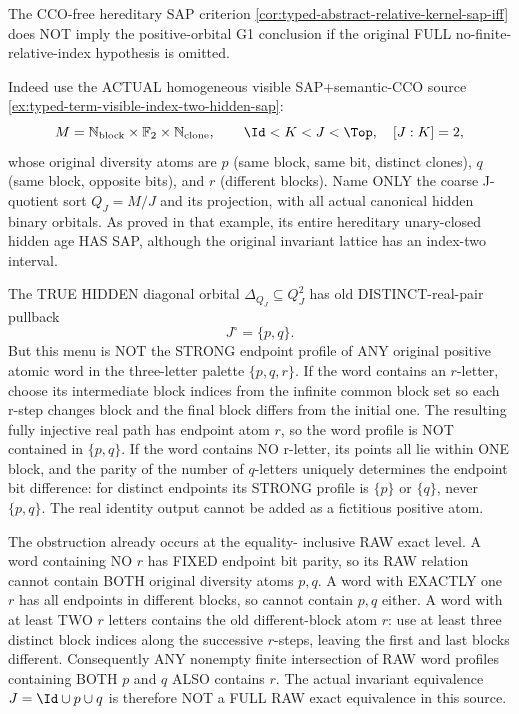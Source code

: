 \begin{remark}
\label{rem:typed-hidden-sap-not-G1-positivity}
The CCO-free hereditary SAP criterion
\cref{cor:typed-abstract-relative-kernel-sap-iff}
does NOT imply the positive-orbital
G1 conclusion if the original FULL
no-finite-relative-index hypothesis
is omitted.

Indeed use the ACTUAL homogeneous
visible SAP+semantic-CCO source
\cref{ex:typed-term-visible-index-two-hidden-sap}:
\[
 M=\mathbb N_{\rm block}\times
      \mathbb F_2\times\mathbb N_{\rm clone},
 \qquad
 \Id<K<J<\Top,\quad[J:K]=2,
\]
whose original diversity
atoms are $p$ (same block,
same bit, distinct clones),
$q$ (same block, opposite
bits), and $r$ (different
blocks). Name ONLY the
coarse J-quotient sort
$Q_J=M/J$ and its projection,
with all actual canonical
hidden binary orbitals.
As proved in that example,
its entire hereditary
unary-closed hidden age
HAS SAP, although the
original invariant lattice
has an index-two interval.

The TRUE HIDDEN diagonal
orbital
$\Delta_{Q_J}\subseteq Q_J^2$
has old DISTINCT-real-pair
pullback
\[
            J^\circ=\{p,q\}.
\tag{FG1}\label{eq:typed-finite-index-G1-failure}
\]
But this menu is NOT the
STRONG endpoint profile of
ANY original positive
atomic word in the
three-letter palette
$\{p,q,r\}$. If the word
contains an $r$-letter,
choose its intermediate
block indices from the
infinite common block set
so each r-step changes
block and the final block
differs from the initial
one. The resulting fully
injective real path has
endpoint atom $r$, so
the word profile is NOT
contained in $\{p,q\}$.
If the word contains
NO r-letter, its points
all lie within ONE block,
and the parity of the
number of $q$-letters
uniquely determines the
endpoint bit difference:
for distinct endpoints
its STRONG profile is
$\{p\}$ or $\{q\}$,
never $\{p,q\}$.
The real identity output
cannot be added as a
fictitious positive atom.

The obstruction already
occurs at the equality-
inclusive RAW exact
level. A word containing
NO $r$ has FIXED endpoint
bit parity, so its RAW
relation cannot contain
BOTH original diversity
atoms $p,q$. A word
with EXACTLY one $r$
has all endpoints in
different blocks, so
cannot contain $p,q$
either. A word with
at least TWO $r$ letters
contains the old
different-block atom
$r$: use at least three
distinct block indices
along the successive
$r$-steps, leaving the
first and last blocks
different. Consequently
ANY nonempty finite
intersection of RAW
word profiles containing
BOTH $p$ and $q$
ALSO contains $r$.
The actual invariant
equivalence
$J=\Id\cup p\cup q$
is therefore NOT a
FULL RAW exact
equivalence in this
source.


\end{remark}
